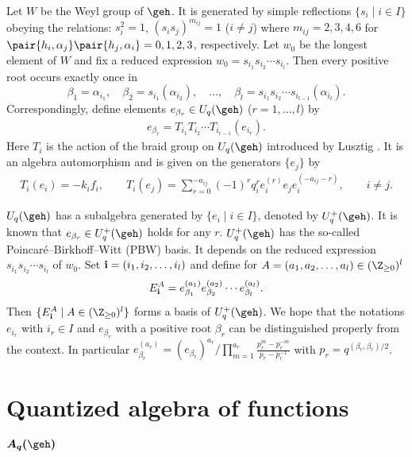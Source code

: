 Let $W$ be the Weyl group of $\geh$. It is generated by simple ref\/lections $\{s_i\mid i\in I\}$
obeying the relations: $s_i^2=1$, $(s_is_j)^{m_{ij}}=1$ ($i\ne j$) where $m_{ij}=2,3,4,6$ for
$\pair{h_i,\alpha_j}\pair{h_j,\alpha_i}=0,1,2,3$, respectively. Let $w_0$ be the longest element
of $W$ and f\/ix a reduced expression $w_0=s_{i_1}s_{i_2}\cdots s_{i_l}$. Then every positive root
occurs exactly once in
\[
\beta_1=\alpha_{i_1},\quad \beta_2=s_{i_1}(\alpha_{i_2}), \quad \ldots,\quad
\beta_l=s_{i_1}s_{i_2}\cdots s_{i_{l-1}}(\alpha_{i_l}).
\]
Correspondingly, def\/ine elements $e_{\beta_r}\in U_q(\geh)$ ($r=1,\ldots,l$) by
\begin{gather}\label{a:ebdef}
e_{\beta_r}=T_{i_1}T_{i_2}\cdots T_{i_{r-1}}(e_{i_r}).
\end{gather}
Here $T_i$ is the action of the braid group on $U_q(\geh)$ introduced by Lusztig \cite{L2}. It is
an algebra automorphism and is given on the generators $\{e_j\}$ by
\begin{gather*}
T_i(e_i) = -k_if_i,
\qquad
T_i(e_j)=\sum_{r=0}^{-a_{ij}}(-1)^r q_i^r e_i^{(r)}e_je_i^{(-a_{ij}-r)},
\qquad i\neq j.
\end{gather*}

$U_q(\geh)$ has a subalgebra generated by $\{e_i\mid i\in I\}$, denoted by $U_q^+(\geh)$.
It is known that $e_{\beta_r} \in U^+_q(\geh)$ holds for any $r$.
$U^+_q(\geh)$ has the
so-called Poincar\'e--Birkhof\/f--Witt (PBW) basis. It depends on the reduced expression
$s_{i_1}s_{i_2}\cdots s_{i_l}$ of $w_0$. Set ${\bf i}=(i_1,i_2,\ldots,i_l)$ and def\/ine for
$A=(a_1,a_2,\ldots,a_l)\in(\Z_{\ge0})^l$
\begin{gather}\label{a:Eai}
E_{\bf i}^A=e_{\beta_1}^{(a_1)}e_{\beta_2}^{(a_2)}\cdots e_{\beta_l}^{(a_l)}.
\end{gather}
Then $\{E_{\bf i}^A\mid A\in(\Z_{\ge0})^l\}$ forms a basis of $U_q^+(\geh)$.
We hope that the notations $e_{i_r}$ with $i_r \in I$ and
$e_{\beta_r}$ with a positive root $\beta_r$
can be distinguished properly from the context.
In particular $e^{(a_r)}_{\beta_r}
= (e_{\beta_r})^{a_r}/\prod\limits_{m=1}^{a_r}\frac{p_r^m-p^{-m}_r}{p_r-p_r^{-1}}$
with $p_r = q^{(\beta_r, \beta_r)/2}$.




\section[Quantized algebra of functions $A_q(\geh)$]{Quantized algebra of functions $\boldsymbol{A_q(\geh)}$}\label{a:sec3}

